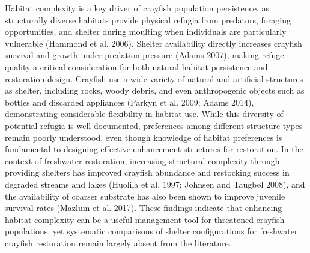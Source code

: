 \documentclass[
  12pt,
  a4paper,
]{scrbook}
\begin{document}
Habitat complexity is a key driver of crayfish population persistence,
as structurally diverse habitats provide physical refugia from
predators, foraging opportunities, and shelter during moulting when
individuals are particularly vulnerable (Hammond et al. 2006). Shelter
availability directly increases crayfish survival and growth under
predation pressure (Adams 2007), making refuge quality a critical
consideration for both natural habitat persistence and restoration
design. Crayfish use a wide variety of natural and artificial structures
as shelter, including rocks, woody debris, and even anthropogenic
objects such as bottles and discarded appliances (Parkyn et al. 2009;
Adams 2014), demonstrating considerable flexibility in habitat use.
While this diversity of potential refugia is well documented,
preferences among different structure types remain poorly understood,
even though knowledge of habitat preferences is fundamental to designing
effective enhancement structures for restoration. In the context of
freshwater restoration, increasing structural complexity through
providing shelters has improved crayfish abundance and restocking
success in degraded streams and lakes (Huolila et al. 1997; Johnsen and
Taugbøl 2008), and the availability of coarser substrate has also been
shown to improve juvenile survival rates (Mazlum et al. 2017). These
findings indicate that enhancing habitat complexity can be a useful
management tool for threatened crayfish populations, yet systematic
comparisons of shelter configurations for freshwater crayfish
restoration remain largely absent from the literature.
\end{document}
